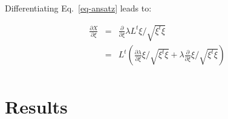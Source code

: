 \documentclass[aip,pof,nofootinbib,reprint,onecolumn]{revtex4-1}
\newcommand{\mypar}[1]{\left(#1\right)}
\newcommand{\rpoint}{X}
\begin{document}
Differentiating Eq.~\eqref{eq-ansatz} leads to:

\begin{equation}
\begin{array}{lll}
\frac{\partial \rpoint}{\partial \xi} &=& \frac{\partial}{\partial \xi} \lambda L^t \xi/\sqrt{\xi^t \xi}\\
 &=& L^t \mypar{\frac{\partial\lambda}{\partial \xi} \xi/\sqrt{\xi^t \xi} + \lambda \frac{\partial}{\partial \xi} \xi/\sqrt{\xi^t \xi} }\\
\end{array}
\end{equation}



%
\section{Results}
\label{sec-results}
\end{document}

